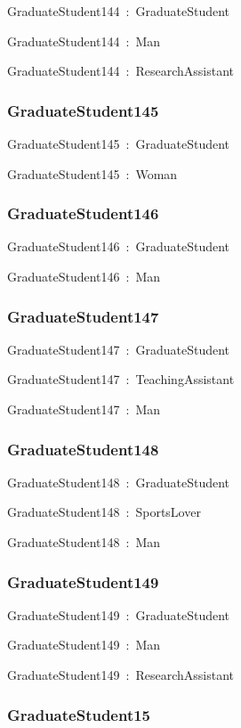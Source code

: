 \documentclass{article}
\begin{document}
GraduateStudent144~:~GraduateStudent

GraduateStudent144~:~Man

GraduateStudent144~:~ResearchAssistant

\subsubsection*{GraduateStudent145}

GraduateStudent145~:~GraduateStudent

GraduateStudent145~:~Woman

\subsubsection*{GraduateStudent146}

GraduateStudent146~:~GraduateStudent

GraduateStudent146~:~Man

\subsubsection*{GraduateStudent147}

GraduateStudent147~:~GraduateStudent

GraduateStudent147~:~TeachingAssistant

GraduateStudent147~:~Man

\subsubsection*{GraduateStudent148}

GraduateStudent148~:~GraduateStudent

GraduateStudent148~:~SportsLover

GraduateStudent148~:~Man

\subsubsection*{GraduateStudent149}

GraduateStudent149~:~GraduateStudent

GraduateStudent149~:~Man

GraduateStudent149~:~ResearchAssistant

\subsubsection*{GraduateStudent15}
\end{document}
